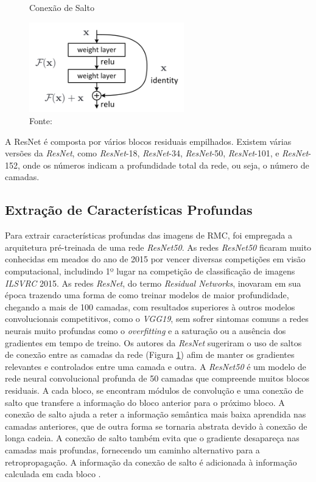 \begin{figure}[h!]
    \centering
    \caption{Conexão de Salto}
    \includegraphics[width=0.6\textwidth]{figures/fig013.png}
    \caption*{Fonte: \cite{aiSelfAttentionBasedFusion2023}}
    \label{fig:fig013}
\end{figure}

A ResNet é composta por vários blocos residuais empilhados.
Existem várias versões da \textit{ResNet}, como \textit{ResNet}-18, \textit{ResNet}-34, \textit{ResNet}-50, \textit{ResNet}-101, e \textit{ResNet}-152, onde os números indicam a profundidade total da rede, ou seja, o número de camadas.

\subsection{Extração de Características Profundas}
\label{subsec:extract_features}

Para extrair características profundas das imagens de \gls{RMC}, foi empregada a arquitetura pré-treinada de uma rede \textit{ResNet50}. As redes \textit{ResNet50} ficaram muito conhecidas em meados do ano de 2015 por vencer diversas competições em visão computacional, includindo 1º lugar na competição de classificação de imagens \textit{ILSVRC} 2015. As redes \textit{ResNet}, do termo \textit{Residual Networks}, inovaram em sua época trazendo uma forma  de como treinar modelos de maior profundidade, chegando a mais de 100 camadas, com resultados superiores à outros modelos convolucionais competitivos, como o \textit{VGG19}, sem sofrer sintomas comuns a redes neurais muito profundas como o \textit{overfitting} e a saturação ou a ausência dos gradientes em tempo de treino. Os autores da \textit{ResNet} sugeriram o uso de saltos de conexão entre as camadas da rede (Figura \ref{fig:fig013}) afim de manter os gradientes relevantes e controlados entre uma camada e outra.  A \textit{ResNet50} é um modelo de rede neural convolucional profunda de 50 camadas que compreende muitos blocos residuais. A cada bloco, se encontram módulos de convolução e uma conexão de salto que transfere a informação do bloco anterior para o próximo bloco. A conexão de salto ajuda a reter a informação semântica mais baixa aprendida nas camadas anteriores, que de outra forma se tornaria abstrata devido à conexão de longa cadeia. A conexão de salto também evita que o gradiente desapareça nas camadas mais profundas, fornecendo um caminho alternativo para a retropropagação. A informação da conexão de salto é adicionada à informação calculada em cada bloco \cite{heDeepResidualLearning2015}.

